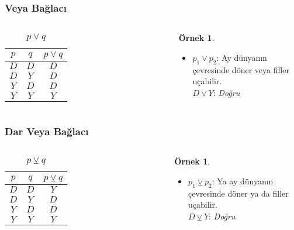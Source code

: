 \documentclass[dvipsnames]{beamer}
\theoremstyle{definition}
\theoremstyle{example}
\newtheorem{ornek}[theorem]{Örnek}
\theoremstyle{plain}
\begin{document}
\begin{frame}
  \frametitle{Veya Bağlacı}

  \begin{columns}
    \begin{table}
      \caption{$p \vee q$}
      \begin{tabular}{|c|c||c|}\hline
        $p$ & $q$ & $p \vee q$\\\hline\hline
        $D$ & $D$ & $D$       \\\hline
        $D$ & $Y$ & $D$       \\\hline
        $Y$ & $D$ & $D$       \\\hline
        $Y$ & $Y$ & $Y$       \\\hline
      \end{tabular}
    \end{table}

    \pause
    \begin{ornek}
      \begin{itemize}
        \item $p_1 \vee p_2$: Ay dünyanın çevresinde döner veya filler
          uçabilir.\\
          $D \vee Y$: \emph{Doğru}
      \end{itemize}
    \end{ornek}
  \end{columns}
\end{frame}

\begin{frame}
  \frametitle{Dar Veya Bağlacı}

  \begin{columns}
    \begin{table}
      \caption{$p \veebar q$}
      \begin{tabular}{|c|c||c|}\hline
        $p$ & $q$ & $p \veebar q$\\\hline\hline
        $D$ & $D$ & $Y$          \\\hline
        $D$ & $Y$ & $D$          \\\hline
        $Y$ & $D$ & $D$          \\\hline
        $Y$ & $Y$ & $Y$          \\\hline
      \end{tabular}
    \end{table}

    \pause
    \begin{ornek}
      \begin{itemize}
        \item $p_1 \veebar p_2$: Ya ay dünyanın çevresinde döner ya da filler
          uçabilir.\\
          $D \veebar Y$: \emph{Doğru}
      \end{itemize}
    \end{ornek}
  \end{columns}
\end{frame}
\end{document}
